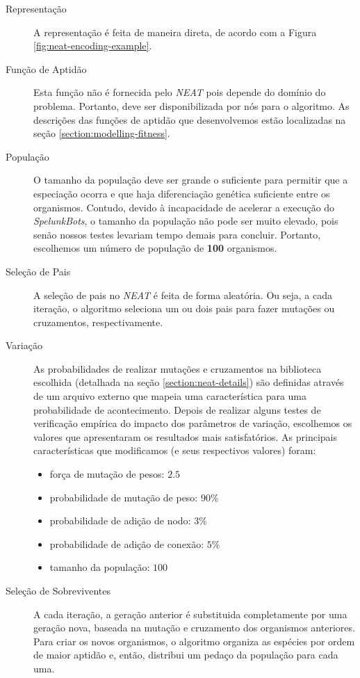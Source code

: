 \begin{description}
	\item[Representação]
		A representação é feita de maneira direta, de acordo com a Figura
		\ref{fig:neat-encoding-example}.

	\item[Função de Aptidão]
		Esta função não é fornecida pelo \textit{NEAT} pois depende do domínio
		do problema. Portanto, deve ser disponibilizada por nós para o
		algoritmo. As descrições das funções de aptidão que desenvolvemos estão
		localizadas na seção \ref{section:modelling-fitness}.

	\item[População]
		O tamanho da população deve ser grande o suficiente para permitir que a
		especiação ocorra e que haja diferenciação genética suficiente entre os
		organismos. Contudo, devido à incapacidade de acelerar a execução do
		\textit{SpelunkBots}, o tamanho da população não pode ser muito elevado,
		pois senão nossos testes levariam tempo demais para concluir. Portanto,
		escolhemos um número de população de \textbf{100} organismos.

	\item[Seleção de Pais] A seleção de pais no \textit{NEAT} é feita de forma
		aleatória. Ou seja, a cada iteração, o algoritmo seleciona um ou dois
		pais para fazer mutações ou cruzamentos, respectivamente.

	\item[Variação] As probabilidades de realizar mutações e cruzamentos na
		biblioteca escolhida (detalhada na seção \ref{section:neat-details}) são
		definidas através de um arquivo externo que mapeia uma característica
		para uma probabilidade de acontecimento. Depois de realizar alguns
		testes de verificação empírica do impacto dos parâmetros de variação,
		escolhemos os valores que apresentaram os resultados mais satisfatórios.
		As principais características que modificamos (e seus respectivos
		valores) foram:
		\begin{itemize}
				\item força de mutação de pesos: $2.5$
				\item probabilidade de mutação de peso: $90\%$
				\item probabilidade de adição de nodo: $3\%$
				\item probabilidade de adição de conexão: $5\%$
				\item tamanho da população: $100$
		\end{itemize}

	\item[Seleção de Sobreviventes]
		A cada iteração, a geração anterior é substituida completamente por uma
		geração nova, baseada na mutação e cruzamento dos organismos anteriores.
		Para criar os novos organismos, o algoritmo organiza as espécies por
		ordem de maior aptidão e, então, distribui um pedaço da população para
		cada uma.
\end{description}

